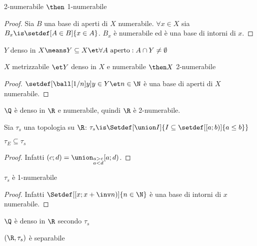 \begin{lemma}
2-numerabile $\then$ 1-numerabile
\end{lemma}
\begin{proof}
Sia $B$ una base di aperti di $X$ numerabile. $\forall x\in X$ sia $B_x\is\setdef[A\in B]{x\in A}$. $B_x$ è numerabile ed è una base di intorni di $x$.
\end{proof}

\begin{defn}[Densità]
$Y$ denso in $X\means Y\subseteq X\et\forall A\text{ aperto}:A\cap Y\neq\emptyset$
\end{defn}

\begin{lemma}
$X$ metrizzabile $\et Y$ denso in $X$ e numerabile $\then X$ 2-numerabile
\end{lemma}
\begin{proof}
$\setdef[{\ball[1/n]y}]{y\in Y\et n\in\N}$ è una base di aperti di $X$ numerabile.
\end{proof}

\begin{es}
$\Q$ è denso in $\R$ e numerabile, quindi $\R$ è 2-numerabile.
\end{es}

\begin{defn}
Sia $\tau_s$ una topologia su $\R$: $\tau_s\is\Setdef[\union I]{I\subseteq\setdef[[a;b)]{a\leq b}}$
\end{defn}

\begin{prop}
$\tau_E\subseteq\tau_s$
\end{prop}
\begin{proof}
Infatti $(c;d)=\union_{\substack{a>c\\a<d}}[a;d)$.
\end{proof}

\begin{prop}
$\tau_s$ è 1-numerabile
\end{prop}
\begin{proof}
Infatti $\Setdef[\left[x;x+\inv n\right)]{n\in\N}$ è una base di intorni di $x$ numerabile.
\end{proof}

\begin{prop}
$\Q$ è denso in $\R$ secondo $\tau_s$
\end{prop}

\begin{prop}
$(\R,\tau_s)$ è separabile
\end{prop}

